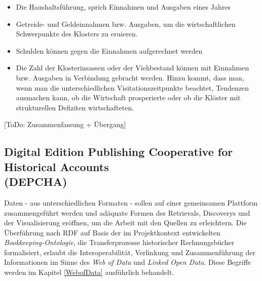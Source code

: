 \documentclass[12pt,a4paper]{article}
\begin{document}
\begin{itemize}
\item Die Haushaltsführung, sprich Einnahmen und Ausgaben eines Jahres 
\item Getreide- und Geldeinnahmen bzw. Ausgaben, um die wirtschaftlichen Schwerpunkte des Klosters zu eruieren.
\item Schulden können gegen die Einnahmen aufgerechnet werden 
\item Die Zahl der Klosterinsassen oder der Viehbestand können mit Einnahmen bzw. Ausgaben in Verbindung gebracht werden. Hinzu kommt, dass man, wenn man die unterschiedlichen Visitationszeitpunkte beachtet,
Tendenzen ausmachen kann, ob die Wirtschaft prosperierte oder ob die Klöster mit
strukturellen Defiziten wirtschafteten.
\end{itemize} 

[ToDo: Zusammenfassung + Übergang]


\newpage
\subsection{Digital Edition Publishing Cooperative for Historical Accounts \\ (DEPCHA)}
\label{DEPCHA}

Daten - aus unterschiedlichen Formaten - sollen auf einer gemeinsamen Plattform zusammengeführt werden und adäquate Formen des Retrievals, Discoverys und der Visualisierung eröffnen, um die Arbeit mit den Quellen zu erleichtern. Die Überführung nach RDF auf Basis der im Projektkontext entwickelten \textit{Bookkeeping-Ontologie}, die Transferprozesse historischer Rechnungsbücher formalisiert, erlaubt die Interoperabilität, Verlinkung und Zusammenführung der Informationen im Sinne des \textit{Web of Data} und \textit{Linked Open Data}. Diese Begriffe werden im Kapitel \ref{WebofData} ausführlich behandelt.
\end{document}
